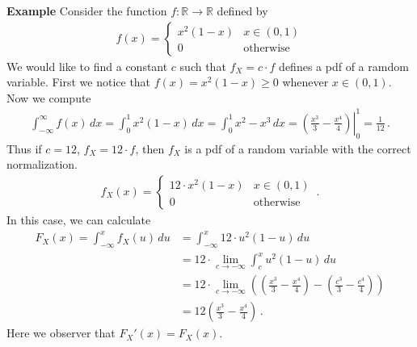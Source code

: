 \documentclass[11pt,oneside]{book}
\theoremstyle{newStyle}
\newcommand{\R}{\mathbb{R}}
\begin{document}
\textbf{Example}
Consider the function $f:\R\to \R$ defined by
\begin{align*}
f(x) = \begin{cases} x^2(1-x) & x\in (0,1) \\ 
0 &\text{otherwise}
\end{cases}
\end{align*}
We would like to find a constant $c$ such that $f_X = c\cdot f$ defines a pdf of a ramdom variable. First we notice that $f(x) = x^2(1-x) \geq 0$ whenever $x \in (0,1)$. Now we compute
\begin{align*}
\int_{-\infty}^\infty f(x) \, dx = \int_0^1 x^2(1-x)\, dx = \int_0^1 x^2 - x^3 \, dx = \left(\left. \frac{x^3}{3} - \frac{x^4}{4}\right) \right|_{0}^1 = \frac{1}{12}\,.
\end{align*}
Thus if $c=12$, $f_X = 12\cdot f$, then $f_X$ is a pdf of a random variable with the correct normalization. 
\begin{align*}
f_X(x) = \begin{cases} 12 \cdot x^2(1-x) & x\in (0,1) \\ 0 &\text{otherwise}\end{cases}\,.
\end{align*} 
In this case, we can calculate
\begin{align*}
F_X(x) = \int_{-\infty}^x f_X(u)\, du &= \int_{-\infty}^x 12 \cdot u^2(1-u)\, du\\
&= 12\cdot \lim_{c\to -\infty}\int_c^x u^2(1-u) \, du \\
&= 12 \cdot \lim_{c\to -\infty}\left( \left( \frac{x^3}{3}-\frac{x^4}{4}\right) - \left( \frac{c^3}{3} - \frac{c^4}{4}\right)\right) \\
&= 12\left( \frac{x^3}{3} - \frac{x^4}{4}\right)\,.
\end{align*}
Here we observer that $F_X'(x) = F_X(x)$. \\
\end{document}
